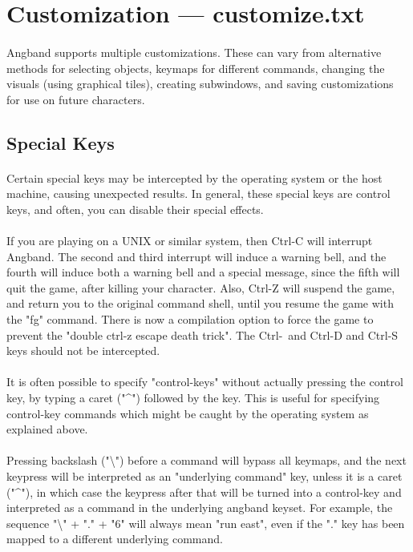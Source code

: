 \section{Customization --- customize.txt}
\paragraph{}Angband supports multiple customizations. These can vary
from alternative methods for selecting objects, keymaps for different
commands, changing the visuals (using graphical tiles), creating
subwindows, and saving customizations for use on future characters.

\subsection{Special Keys}
\paragraph{}Certain special keys may be intercepted by the operating
system or the host machine, causing unexpected results. In general,
these special keys are control keys, and often, you can disable their
special effects.

\paragraph{}If you are playing on a UNIX or similar system, then Ctrl-C will
interrupt Angband. The second and third interrupt will induce a warning
bell, and the fourth will induce both a warning bell and a special message,
since the fifth will quit the game, after killing your character. Also,
Ctrl-Z will suspend the game, and return you to the original command shell,
until you resume the game with the "fg" command. There is now a compilation
option to force the game to prevent the "double ctrl-z escape death trick".
The Ctrl-\ and Ctrl-D and Ctrl-S keys should not be intercepted.
 
\paragraph{}It is often possible to specify "control-keys" without actually
pressing the control key, by typing a caret ("\^{}") followed by the key.
This is useful for specifying control-key commands which might be caught
by the operating system as explained above.

\paragraph{}Pressing backslash ("\textbackslash ") before a command will bypass all keymaps,
and the next keypress will be interpreted as an "underlying command" key,
unless it is a caret ("\^{}"), in which case the keypress after that will be
turned into a control-key and interpreted as a command in the underlying
angband keyset. For example, the sequence "\textbackslash " + "." + "6"
will always mean "run east", even if the "." key has been mapped to a
different underlying command.


